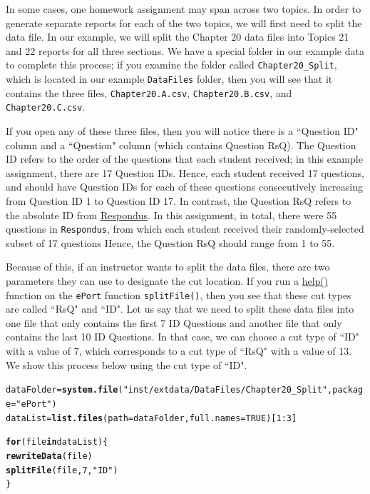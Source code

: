 \documentclass{article}\usepackage[]{graphicx}\usepackage[]{color}
\makeatletter
\newcommand{\hlnum}[1]{\textcolor[rgb]{0.686,0.059,0.569}{#1}}%
\newcommand{\hlstr}[1]{\textcolor[rgb]{0.192,0.494,0.8}{#1}}%
\newcommand{\hlopt}[1]{\textcolor[rgb]{0,0,0}{#1}}%
\newcommand{\hlstd}[1]{\textcolor[rgb]{0.345,0.345,0.345}{#1}}%
\newcommand{\hlkwa}[1]{\textcolor[rgb]{0.161,0.373,0.58}{\textbf{#1}}}%
\newcommand{\hlkwb}[1]{\textcolor[rgb]{0.69,0.353,0.396}{#1}}%
\newcommand{\hlkwc}[1]{\textcolor[rgb]{0.333,0.667,0.333}{#1}}%
\newcommand{\hlkwd}[1]{\textcolor[rgb]{0.737,0.353,0.396}{\textbf{#1}}}%
\newenvironment{kframe}{%
 \def\at@end@of@kframe{}%
 \ifinner\ifhmode%
  \def\at@end@of@kframe{\end{minipage}}%
  \begin{minipage}{\columnwidth}%
 \fi\fi%
 \def\FrameCommand##1{\hskip\@totalleftmargin \hskip-\fboxsep
 \colorbox{shadecolor}{##1}\hskip-\fboxsep
     \hskip-\linewidth \hskip-\@totalleftmargin \hskip\columnwidth}%
 \MakeFramed {\advance\hsize-\width
   \@totalleftmargin\z@ \linewidth\hsize
   \@setminipage}}%
 {\par\unskip\endMakeFramed%
 \at@end@of@kframe}
\newenvironment{knitrout}{}{} %
\numberwithin{equation}{section} %
\makeatother
\begin{document}
In some cases, one homework assignment may span across two topics. In order to generate separate reports for each of the two topics, we will first need to split the data file. In our example, we will split the Chapter 20 data files into Topics 21 and 22 reports for all three sections. We have a special folder in our example data to complete this process; if you examine the folder called \texttt{Chapter20\_Split}, which is located in our example \texttt{DataFiles} folder, then you will see that it contains the three files, \texttt{Chapter20.A.csv}, \texttt{Chapter20.B.csv}, and \texttt{Chapter20.C.csv}.

If you open any of these three files, then you will notice there is a ``Question ID" column and a ``Question" column (which contains Question RsQ). The Question ID refers to the order of the questions that each student received; in this example assignment, there are 17 Question IDs. Hence, each student received 17 questions, and should have Question IDs for each of these questions consecutively increasing from Question ID 1 to Question ID 17. In contrast, the Question RsQ refers to the absolute ID from \hyperref[sec:ResSection]{Respondus}. In this assignment, in total, there were 55 questions in \texttt{Respondus}, from which each student received their randomly-selected subset of 17 questions Hence, the Question RsQ should range from 1 to 55.

Because of this, if an instructor wants to split the data files, there are two parameters they can use to designate the cut location. If you run a \hyperref[sec:helpSection]{help()} function on the \texttt{ePort} function \texttt{splitFile()}, then you see that these cut types are called ``RsQ" and ``ID". Let us say that we need to split these data files into one file that only contains the first 7 ID Questions and another file that only contains the last 10 ID Questions. In that case, we can choose a cut type of ``ID" with a value of 7, which corresponds to a cut type of ``RsQ" with a value of 13. We show this process below using the cut type of ``ID". \\

\begin{knitrout}
\color{fgcolor}\begin{kframe}
\begin{alltt}
\hlstd{dataFolder} \hlkwb{=} \hlkwd{system.file}\hlstd{(}\hlstr{"inst/extdata/DataFiles/Chapter20_Split"}\hlstd{,} \hlkwc{package} \hlstd{=} \hlstr{"ePort"}\hlstd{)}
\hlstd{dataList} \hlkwb{=} \hlkwd{list.files}\hlstd{(}\hlkwc{path} \hlstd{= dataFolder,} \hlkwc{full.names} \hlstd{=} \hlnum{TRUE}\hlstd{)[}\hlnum{1}\hlopt{:}\hlnum{3}\hlstd{]}

\hlkwa{for}\hlstd{(file} \hlkwa{in} \hlstd{dataList)\{}
  \hlkwd{rewriteData}\hlstd{(file)}
  \hlkwd{splitFile}\hlstd{(file,} \hlnum{7}\hlstd{,} \hlstr{"ID"}\hlstd{)}
\hlstd{\}}
\end{alltt}
\end{kframe}
\end{knitrout}
\end{document}
